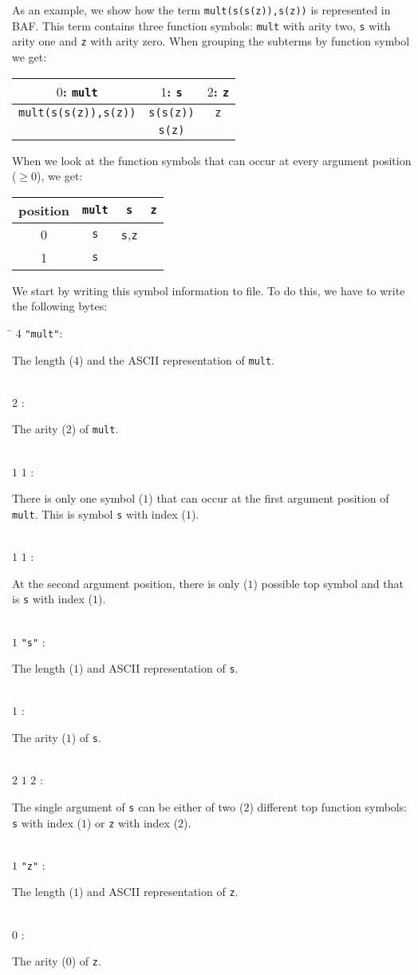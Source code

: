 \documentclass{article}
\newcommand{\tabline}[2]
{#1\>: 
\begin{minipage}[t]{\textwidth-1.5cm}
#2
\end{minipage}}
\begin{document}
As an example, we show how the term \texttt{mult(s(s(z)),s(z))} is represented in BAF. This term contains three function 
symbols: \texttt{mult} with arity two, \texttt{s} with arity one  and \texttt{z} with arity zero. When grouping the subterms by function symbol we get:
\begin{center}
\begin{tabular}{|c|c|c|}
\hline
$0$: \texttt{mult}&$1$: \texttt{s}&$2$: \texttt{z}\\
\hline
\texttt{mult(s(s(z)),s(z))}&\texttt{s(s(z))}&\texttt{z}\\
                           &\texttt{s(z)}&\\
\hline
\end{tabular}
\end{center}
When we look at the function symbols that can occur at every argument position ($\geq 0$), we get:
\begin{center}
\begin{tabular}{|c|c|c|c|}
\hline
position&\texttt{mult}&\texttt{s}&\texttt{z}\\
\hline
0&\texttt{s}&\texttt{s},\texttt{z}&\\
1&\texttt{s}&&\\
\hline

\end{tabular}
\end{center}
We start by writing this symbol information to file. To do this, we have to write the following bytes:
\begin{tabbing}
\hspace{1.5cm}\=\kill
\tabline{$4$ \texttt{"mult"}}{The length ($4$) and the ASCII representation of \texttt{mult}.}\\
\tabline{$2$                }{The arity ($2$) of \texttt{mult}.}\\
\tabline{$1$ $1$            }{There is only one symbol ($1$) that can occur at the first argument position of 
                              \texttt{mult}. This is symbol \texttt{s} with index ($1$).}\\
\tabline{$1$ $1$            }{At the second argument position, there is only ($1$) possible top symbol and that is 
                              \texttt{s} with index ($1$).}\\
\tabline{$1$ \texttt{"s"}   }{The length ($1$) and ASCII representation of \texttt{s}.}\\
\tabline{$1$                }{The arity ($1$) of \texttt{s}.}\\
\tabline{$2$ $1$ $2$        }{The single argument of \texttt{s} can be either of two ($2$) different top function
                              symbols: \texttt{s} with index ($1$) or \texttt{z} with index ($2$).}\\
\tabline{$1$ \texttt{"z"}   }{The length ($1$) and ASCII representation of \texttt{z}.}\\
\tabline{$0$                }{The arity ($0$) of \texttt{z}.}
\end{tabbing}
\end{document}
